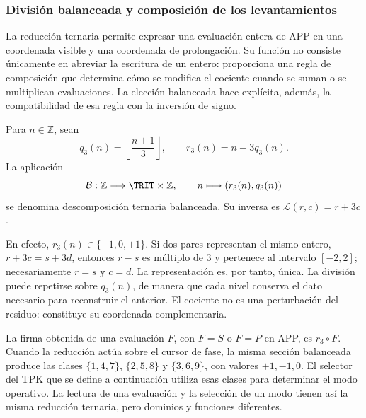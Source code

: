 \subsubsection{División balanceada y composición de los levantamientos}
\label{trit-ampl-div-balanceada}

La reducción ternaria permite expresar una evaluación entera de APP en una
coordenada visible y una coordenada de prolongación. Su función no consiste
únicamente en abreviar la escritura de un entero: proporciona una regla de
composición que determina cómo se modifica el cociente cuando se suman o se
multiplican evaluaciones. La elección balanceada hace explícita, además, la
compatibilidad de esa regla con la inversión de signo.

\begin{definition}
\label{trit-ampl-def-coordenadas}
Para \(n\in\mathbb Z\), sean
\[
 q_3(n)=\left\lfloor\frac{n+1}{3}\right\rfloor,\qquad
 r_3(n)=n-3q_3(n).
\]
La aplicación
\[
 \mathcal B:\mathbb Z\longrightarrow\TRIT\times\mathbb Z,\qquad
 n\longmapsto(r_3(n),q_3(n))
\]
se denomina descomposición ternaria balanceada. Su inversa es
\(\mathcal L(r,c)=r+3c\).
\end{definition}

En efecto, \(r_3(n)\in\{-1,0,+1\}\). Si dos pares representan el mismo entero,
\(r+3c=s+3d\), entonces \(r-s\) es múltiplo de \(3\) y pertenece al intervalo
\([-2,2]\); necesariamente \(r=s\) y \(c=d\). La representación es, por tanto,
única. La división puede repetirse sobre \(q_3(n)\), de manera que cada nivel
conserva el dato necesario para reconstruir el anterior. El cociente no es una
perturbación del residuo: constituye su coordenada complementaria.

La firma obtenida de una evaluación \(F\), con \(F=S\) o \(F=P\) en APP,
es \(r_3\circ F\). Cuando la reducción actúa sobre el cursor de fase, la misma
sección balanceada produce las clases \(\{1,4,7\}\), \(\{2,5,8\}\) y
\(\{3,6,9\}\), con valores \(+1,-1,0\). El selector del TPK que se define
a continuación utiliza esas clases para determinar el modo operativo.
La lectura de una evaluación y la selección de un modo tienen así la misma
reducción ternaria, pero dominios y funciones diferentes.

